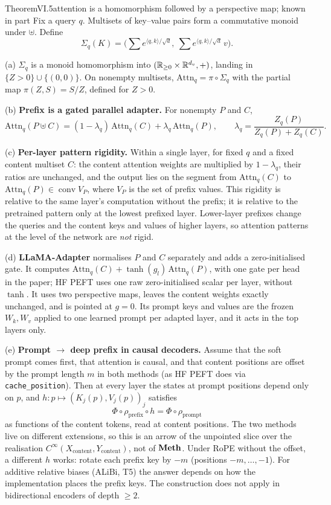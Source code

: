 \begin{restate}{Theorem}{VI.5}{attention is a homomorphism followed by a perspective map; known in part}
Fix a query $q$. Multisets of key--value pairs form a commutative monoid under $\uplus$. Define
\[\Sigma_q(K)=\Big(\sum e^{\langle q,k\rangle/\sqrt d},\ \sum e^{\langle q,k\rangle/\sqrt d}\,v\Big).\]

(a) $\Sigma_q$ is a monoid homomorphism into $(\mathbb{R}_{\ge0}\times\mathbb{R}^{d_v},+)$, landing in $\{Z>0\}\cup\{(0,0)\}$. On nonempty
multisets, $\mathrm{Attn}_q=\pi\circ\Sigma_q$ with the partial map $\pi(Z,S)=S/Z$, defined for $Z>0$.

(b) \textbf{Prefix is a gated parallel adapter.} For nonempty $P$ and $C$,
\[\mathrm{Attn}_q(P\uplus C)=(1-\lambda_q)\,\mathrm{Attn}_q(C)+\lambda_q\,\mathrm{Attn}_q(P),\qquad
\lambda_q=\frac{Z_q(P)}{Z_q(P)+Z_q(C)}.\]

(c) \textbf{Per-layer pattern rigidity.} Within a single layer, for fixed $q$ and a fixed content multiset $C$: the content
attention weights are multiplied by $1-\lambda_q$, their ratios are unchanged, and the output lies on the segment from
$\mathrm{Attn}_q(C)$ to $\mathrm{Attn}_q(P)\in\operatorname{conv}V_P$, where $V_P$ is the set of prefix values. This rigidity
is relative to the same layer's computation without the prefix; it is relative to the pretrained pattern only at the lowest
prefixed layer. Lower-layer prefixes change the queries and the content keys and values of higher layers, so attention
patterns at the level of the network are \emph{not} rigid.

(d) \textbf{LLaMA-Adapter} normalises $P$ and $C$ separately and adds a zero-initialised gate. It computes
$\mathrm{Attn}_q(C)+\tanh(g_l)\,\mathrm{Attn}_q(P)$, with one gate per head in the paper; HF PEFT uses one raw
zero-initialised scalar per layer, without $\tanh$. It uses two perspective maps, leaves the content weights exactly
unchanged, and is pointed at $g=0$. Its prompt keys and values are the frozen $W_k,W_v$ applied to one learned prompt per
adapted layer, and it acts in the top layers only.

(e) \textbf{Prompt $\to$ deep prefix in causal decoders.} Assume that the soft prompt comes first, that attention is causal,
and that content positions are offset by the prompt length $m$ in both methods (as HF PEFT does via \texttt{cache\_position}).
Then at every layer the states at prompt positions depend only on $p$, and $h:p\mapsto(K_j(p),V_j(p))_j$ satisfies
\[\Phi\circ\rho_{\mathrm{prefix}}\circ h=\Phi\circ\rho_{\mathrm{prompt}}\]
as functions of the content tokens, read at content positions. The two methods live on different extensions, so this is an
arrow of the unpointed slice over the realisation $C^\infty(X_{\mathrm{content}},Y_{\mathrm{content}})$, not of $\mathbf{Meth}$.
Under RoPE without the offset, a different $h$ works: rotate each prefix key by $-m$ (positions $-m,\dots,-1$). For additive
relative biases (ALiBi, T5) the answer depends on how the implementation places the prefix keys. The construction does not
apply in bidirectional encoders of depth $\ge2$.


\end{restate}
